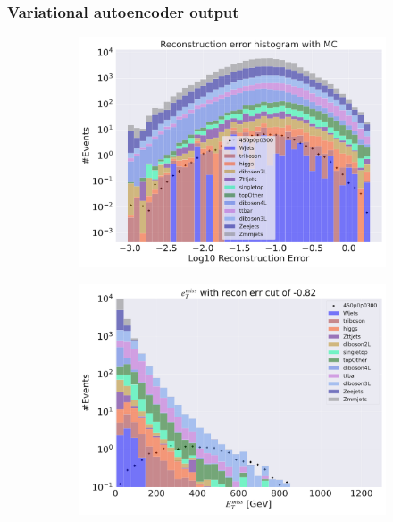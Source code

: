 \subsubsection*{Variational autoencoder output}

\begin{figure}[H]
    \centering
    \begin{subfigure}{.49\textwidth}
        \includegraphics[width=\textwidth]{Figures/VAE_testing/big/3lep/b_data_recon_big_rm3_feats_sig_450p0p0300.pdf}
        \caption{ }
        \label{fig:VAE_3lep_big_450_2}
    \end{subfigure}
    \hfill
    \begin{subfigure}{.49\textwidth}
        \includegraphics[width=\textwidth]{Figures/VAE_testing/big/3lep/b_data_recon_big_rm3_feats_sig_450p0p0300_etmiss_recon_errcut_-0.82.pdf}

\end{subfigure}
\end{figure}
